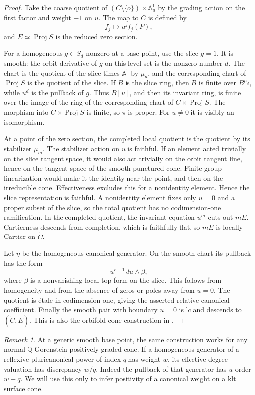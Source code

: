 \documentclass[11pt]{article}
\theoremstyle{definition}
\theoremstyle{remark}
\newtheorem{remark}[theorem]{Remark}
\numberwithin{equation}{section}
\newcommand{\Q}{\mathbb Q}
\newcommand{\A}{\mathbb A}
\newcommand{\Proj}{\operatorname{Proj}}
\begin{document}
\begin{proof}
Take the coarse quotient of \((C\setminus\{o\})\times\A^1_u\) by the grading action on the first factor and weight \(-1\) on \(u\). The map to \(C\) is defined by
\[
f_j\longmapsto u^j f_j(P),
\]
and \(E\simeq\Proj S\) is the reduced zero section.

For a homogeneous \(g\in S_d\) nonzero at a base point, use the slice \(g=1\). It is smooth: the orbit derivative of \(g\) on this level set is the nonzero number \(d\). The chart is the quotient of the slice times \(\A^1\) by \(\mu_d\), and the corresponding chart of \(\Proj S\) is the quotient of the slice. If \(B\) is the slice ring, then \(B\) is finite over \(B^{\mu_d}\), while \(u^d\) is the pullback of \(g\). Thus \(B[u]\), and then its invariant ring, is finite over the image of the ring of the corresponding chart of \(C\times\Proj S\). The morphism into \(C\times\Proj S\) is finite, so \(\pi\) is proper. For \(u\ne0\) it is visibly an isomorphism.

At a point of the zero section, the completed local quotient is the quotient by its stabilizer \(\mu_m\). The stabilizer action on \(u\) is faithful. If an element acted trivially on the slice tangent space, it would also act trivially on the orbit tangent line, hence on the tangent space of the smooth punctured cone. Finite-group linearization would make it the identity near the point, and then on the irreducible cone. Effectiveness excludes this for a nonidentity element. Hence the slice representation is faithful. A nonidentity element fixes only \(u=0\) and a proper subset of the slice, so the total quotient has no codimension-one ramification. In the completed quotient, the invariant equation \(u^m\) cuts out \(mE\). Cartierness descends from completion, which is faithfully flat, so \(mE\) is locally Cartier on \(\widetilde C\).

Let \(\eta\) be the homogeneous canonical generator. On the smooth chart its pullback has the form
\[
u^{r-1}\,du\wedge\beta,
\]
where \(\beta\) is a nonvanishing local top form on the slice. This follows from homogeneity and from the absence of zeros or poles away from \(u=0\). The quotient is étale in codimension one, giving the asserted relative canonical coefficient. Finally the smooth pair with boundary \(u=0\) is lc and descends to \((\widetilde C,E)\). This is also the orbifold-cone construction in \cite[Section~2 and Proposition~2.1]{LiZhou}.
\end{proof}

\begin{remark}\label{rem:degree}
At a generic smooth base point, the same construction works for any normal \(\Q\)-Gorenstein positively graded cone. If a homogeneous generator of a reflexive pluricanonical power of index \(q\) has weight \(w\), its effective degree valuation has discrepancy \(w/q\). Indeed the pullback of that generator has \(u\)-order \(w-q\). We will use this only to infer positivity of a canonical weight on a klt surface cone.
\end{remark}
\end{document}
